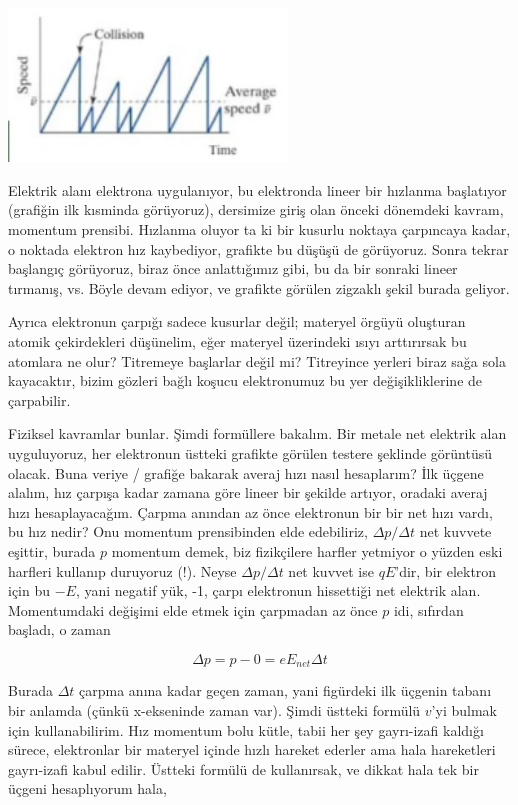 \documentclass[12pt,fleqn]{article}\usepackage{../../common}
\begin{document}
\includegraphics[width=20em]{04_15.png}

Elektrik alanı elektrona uygulanıyor, bu elektronda lineer bir hızlanma
başlatıyor (grafiğin ilk kısminda görüyoruz), dersimize giriş olan önceki
dönemdeki kavram, momentum prensibi. Hızlanma oluyor ta ki bir kusurlu noktaya
çarpıncaya kadar, o noktada elektron hız kaybediyor, grafikte bu düşüşü de
görüyoruz. Sonra tekrar başlangıç görüyoruz, biraz önce anlattığımız gibi, bu
da bir sonraki lineer tırmanış, vs. Böyle devam ediyor, ve grafikte görülen
zigzaklı şekil burada geliyor.

Ayrıca elektronun çarpığı sadece kusurlar değil; materyel örgüyü oluşturan
atomik çekirdekleri düşünelim, eğer materyel üzerindeki ısıyı arttırırsak bu
atomlara ne olur? Titremeye başlarlar değil mi? Titreyince yerleri biraz sağa
sola kayacaktır, bizim gözleri bağlı koşucu elektronumuz bu yer değişikliklerine
de çarpabilir.

Fiziksel kavramlar bunlar. Şimdi formüllere bakalım. Bir metale net
elektrik alan uyguluyoruz, her elektronun üstteki grafikte görülen testere
şeklinde görüntüsü olacak. Buna veriye / grafiğe bakarak averaj hızı nasıl
hesaplarım? İlk üçgene alalım, hız çarpışa kadar zamana göre lineer bir
şekilde artıyor, oradaki averaj hızı hesaplayacağım. Çarpma anından az önce
elektronun bir bir net hızı vardı, bu hız nedir? Onu momentum prensibinden
elde edebiliriz, $\Delta p / \Delta t$ net kuvvete eşittir, burada $p$
momentum demek, biz fizikçilere harfler yetmiyor o yüzden eski harfleri
kullanıp duruyoruz (!). Neyse $\Delta p / \Delta t$ net kuvvet ise
$qE$'dir, bir elektron için bu $-E$, yani negatif yük, -1, çarpı elektronun
hissettiği net elektrik alan. Momentumdaki değişimi elde etmek için
çarpmadan az önce $p$ idi, sıfırdan başladı, o zaman

$$ \Delta p = p - 0 = e E_{net} \Delta t$$

Burada $\Delta t$ çarpma anına kadar geçen zaman, yani figürdeki ilk
üçgenin tabanı bir anlamda (çünkü x-ekseninde zaman var). Şimdi üstteki
formülü $v$'yi bulmak için kullanabilirim. Hız momentum bolu kütle, tabii
her şey gayrı-izafi kaldığı sürece, elektronlar bir materyel içinde hızlı
hareket ederler ama hala hareketleri gayrı-izafi kabul edilir. Üstteki
formülü de kullanırsak, ve dikkat hala tek bir üçgeni hesaplıyorum hala, 
\end{document}

